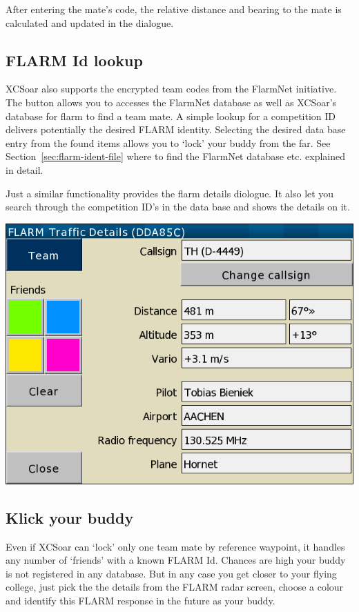 After entering the mate's code, the relative distance and 
bearing to the mate is calculated and updated in the dialogue.

\subsection*{FLARM Id lookup}
XCSoar also supports the encrypted team codes from the FlarmNet initiative.
The  button allows you to accesses the FlarmNet database as well 
as XCSoar's database for flarm to find a team mate. A simple 
lookup for a competition ID delivers potentially the desired 
FLARM identity. Selecting the desired data base entry from the found items allows you 
to `lock' your buddy from the far. See Section~\ref{sec:flarm-ident-file} 
where to find the FlarmNet database etc. explained in detail.

Just a similar functionality provides the flarm details diologue. It also let 
you search through the competition ID's in the data base and shows the details on it.  

\begin{center}
\includegraphics[angle=0,width=0.8\linewidth,keepaspectratio='true']{figures/dialog-flarmdetails.png}
\end{center}

\subsection*{Klick your buddy}
Even if XCSoar can `lock' only one team mate by reference waypoint, 
it handles any number of `friends' with a known FLARM Id. Chances are high your buddy is not 
registered in any database. But in any case you get closer to 
your flying college, just pick the the details from the FLARM radar screen, choose 
a colour and identify this FLARM response in the future as your buddy.


